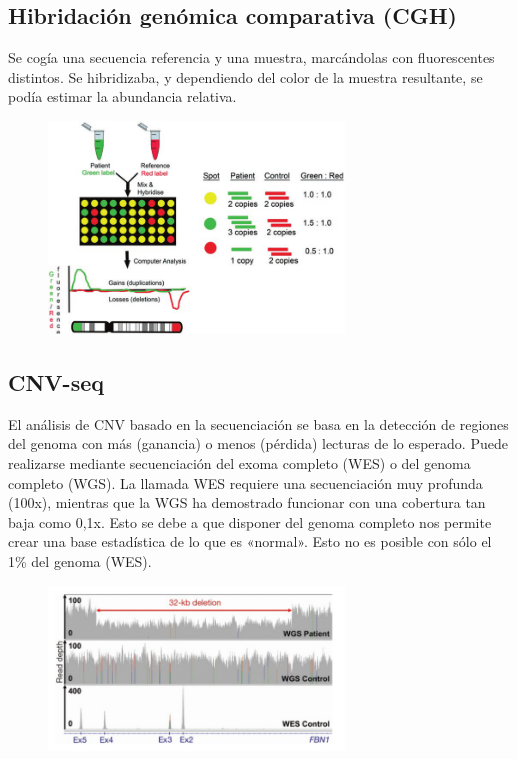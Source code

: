 \subsection{Hibridación genómica comparativa (CGH)}
Se cogía una secuencia referencia y una muestra, marcándolas con fluorescentes distintos. Se hibridizaba, y dependiendo del color de la muestra resultante, se podía estimar la abundancia relativa. 

\begin{figure}[h!]
\centering
\includegraphics[width = 0.7\textwidth]{figs/Comparative-genome-hybridization-CGH-microarray-Karampetsou-et-al-2014.png}
\end{figure}

\subsection{CNV-seq}
El análisis de CNV basado en la secuenciación se basa en la detección de regiones del genoma con más (ganancia) o menos (pérdida) lecturas de lo esperado.
Puede realizarse mediante secuenciación del exoma completo (WES) o del genoma completo (WGS).
La llamada WES requiere una secuenciación muy profunda (100x), mientras que la WGS ha demostrado funcionar con una cobertura tan baja como 0,1x.
Esto se debe a que disponer del genoma completo nos permite crear una base estadística de lo que es «normal». Esto no es posible con sólo el 1\% del genoma (WES).

\begin{figure}[h!]
\centering
\includegraphics[width = 0.7\textwidth]{figs/cnv-calling-wgs.png}
\end{figure}

